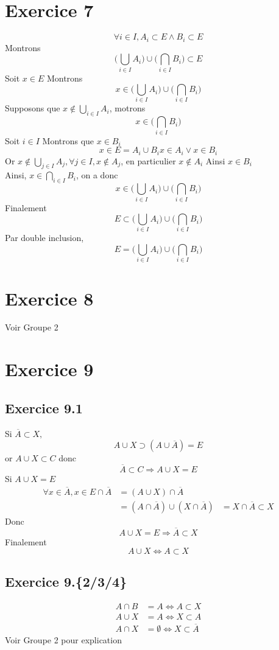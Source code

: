 \documentclass[a4paper,12pt]{article}
\begin{document}
\section{Exercice 7}
$$\forall i \in I, A_i \subset E \wedge B_i \subset E$$
Montrons
$$\Big( \bigcup_ {i\in I} A_i \Big) \cup \Big( \bigcap_ {i\in I} B_i \Big) \subset E$$
Soit $x \in E$ Montrons 
$$ x \in \Big( \bigcup_ {i\in I} A_i \Big) \cup \Big( \bigcap_ {i\in I} B_i \Big)$$
Supposons que $ x \not \in  \bigcup_ {i\in I} A_i$, motrons 
$$x \in \Big( \bigcap_ {i\in I} B_i \Big)$$
Soit $i \in I$ Montrons que $x \in B_i$
\[
x \in E = A_i \cup B_i
x \in A_i \vee x \in B_i
\]
Or $ x \not \in  \bigcup_ {j\in I} A_j, \forall j \in I, x \not\in A_j$, en particulier $x \not\in A_i$ Ainsi $x \in B_i$\\
Ainsi, $x \in \bigcap_ {i\in I} B_i$, on a donc $$x \in \Big( \bigcup_ {i\in I} A_i \Big) \cup \Big( \bigcap_ {i\in I} B_i \Big)$$
Finalement
$$E \subset \Big( \bigcup_ {i\in I} A_i \Big) \cup \Big( \bigcap_ {i\in I} B_i \Big)$$
Par double inclusion, $$E = \Big( \bigcup_ {i\in I} A_i \Big) \cup \Big( \bigcap_ {i\in I} B_i \Big)$$

\section{Exercice 8}
Voir Groupe 2
\section{Exercice 9} 
\subsection{Exercice 9.1}
Si $ \overline{A} \subset X, $
$$A \cup X \supset (A \cup \overline{A}) = E$$
or $A \cup X \subset C$
donc 
$$\overline{A} \subset C \Rightarrow A \cup X = E$$
Si $A \cup X = E$
\[
\begin{aligned}
\forall x \in \overline{A}, x \in E \cap \overline{A} &= (A \cup X) \cap \overline{A}\\
&= (A \cap \overline{A}) \cup (X \cap \overline{A})
&= X \cap \overline{A} \subset X
\end{aligned}
\]
Donc $$A \cup X = E \Rightarrow \overline{A} \subset X$$
Finalement $$A\cup X \Leftrightarrow A \subset X$$
\subsection{Exercice 9.\{2/3/4\}}
\[
\begin{aligned}
A \cap B &= A \Leftrightarrow A \subset X\\
A  \cup X &= A \Leftrightarrow X \subset A\\
A \cap X &= \emptyset \Leftrightarrow X \subset \overline{A}
\end{aligned}
\]
Voir Groupe 2 pour explication
\end{document}
